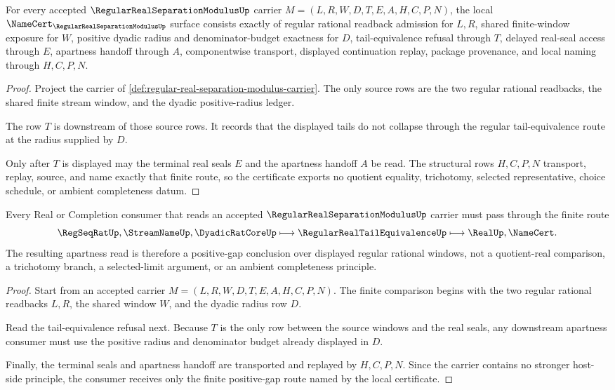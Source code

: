 \begin{theorem}
\label{thm:regular-real-separation-modulus-namecert-obligations}
For every accepted $\RegularRealSeparationModulusUp$ carrier $M=(L,R,W,D,T,E,A,H,C,P,N)$, the local $\NameCert_{\RegularRealSeparationModulusUp}$ surface consists exactly of regular rational readback admission for $L,R$, shared finite-window exposure for $W$, positive dyadic radius and denominator-budget exactness for $D$, tail-equivalence refusal through $T$, delayed real-seal access through $E$, apartness handoff through $A$, componentwise transport, displayed continuation replay, package provenance, and local naming through $H,C,P,N$.
\end{theorem}
\begin{proof}
Project the carrier of \autoref{def:regular-real-separation-modulus-carrier}. The only source rows are the two regular rational readbacks, the shared finite stream window, and the dyadic positive-radius ledger.

The row $T$ is downstream of those source rows. It records that the displayed tails do not collapse through the regular tail-equivalence route at the radius supplied by $D$.

Only after $T$ is displayed may the terminal real seals $E$ and the apartness handoff $A$ be read. The structural rows $H,C,P,N$ transport, replay, source, and name exactly that finite route, so the certificate exports no quotient equality, trichotomy, selected representative, choice schedule, or ambient completeness datum.
\end{proof}

\begin{theorem}
\label{thm:regular-real-separation-modulus-finite-gap-route}
Every Real or Completion consumer that reads an accepted $\RegularRealSeparationModulusUp$ carrier must pass through the finite route
$$
\RegSeqRatUp,\StreamNameUp,\DyadicRatCoreUp
\longmapsto
\RegularRealTailEquivalenceUp
\longmapsto
\RealUp,\NameCert .
$$
The resulting apartness read is therefore a positive-gap conclusion over displayed regular rational windows, not a quotient-real comparison, a trichotomy branch, a selected-limit argument, or an ambient completeness principle.
\end{theorem}
\begin{proof}
Start from an accepted carrier $M=(L,R,W,D,T,E,A,H,C,P,N)$. The finite comparison begins with the two regular rational readbacks $L,R$, the shared window $W$, and the dyadic radius row $D$.

Read the tail-equivalence refusal next. Because $T$ is the only row between the source windows and the real seals, any downstream apartness consumer must use the positive radius and denominator budget already displayed in $D$.

Finally, the terminal seals and apartness handoff are transported and replayed by $H,C,P,N$. Since the carrier contains no stronger host-side principle, the consumer receives only the finite positive-gap route named by the local certificate.
\end{proof}

